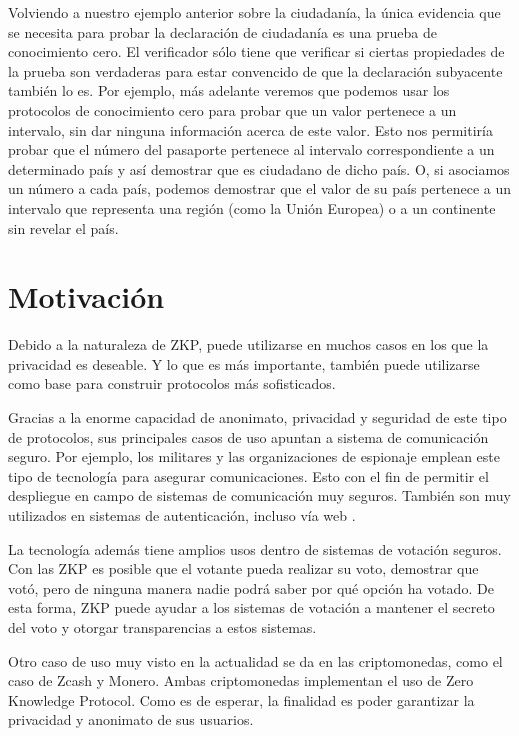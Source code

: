 Volviendo a nuestro ejemplo anterior sobre la ciudadanía, la única evidencia que se necesita para probar la declaración de ciudadanía es una prueba de conocimiento cero. El verificador sólo tiene que verificar si ciertas propiedades de la prueba son verdaderas para estar convencido de que la declaración subyacente también lo es. Por ejemplo, más adelante veremos que podemos usar los protocolos de conocimiento cero para probar que un valor pertenece a un intervalo, sin dar ninguna información acerca de este valor. Esto nos permitiría probar que el número del pasaporte pertenece al intervalo correspondiente a un determinado país y así demostrar que es ciudadano de dicho país. O, si asociamos un número a cada país, podemos demostrar que el valor de su país pertenece a un intervalo que representa una región (como la Unión Europea) o a un continente sin revelar el país.

\section{Motivación}

Debido a la naturaleza de ZKP, puede utilizarse en muchos casos en los que la privacidad es deseable. Y lo que es más importante, también puede utilizarse como base para construir protocolos más sofisticados.

Gracias a la enorme capacidad de anonimato, privacidad y seguridad de este tipo de protocolos, sus principales casos de uso apuntan a sistema de comunicación seguro. Por ejemplo, los militares y las organizaciones de espionaje emplean este tipo de tecnología para asegurar comunicaciones. Esto con el fin de permitir el despliegue en campo de sistemas de comunicación muy seguros. También son muy utilizados en sistemas de autenticación, incluso vía web \cite{Motivacion}.

La tecnología además tiene amplios usos dentro de sistemas de votación seguros. Con las ZKP es posible que el votante pueda realizar su voto, demostrar que votó, pero de ninguna manera nadie podrá saber por qué opción ha votado. De esta forma, ZKP puede ayudar a los sistemas de votación a mantener el secreto del voto y otorgar transparencias a estos sistemas.

Otro caso de uso muy visto en la actualidad se da en las criptomonedas, como el caso de Zcash y Monero. Ambas criptomonedas implementan el uso de Zero Knowledge Protocol. Como es de esperar, la finalidad es poder garantizar la privacidad y anonimato de sus usuarios.

